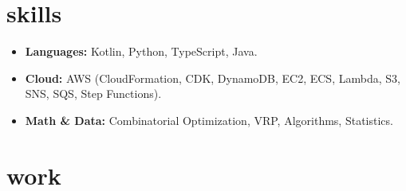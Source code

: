 \documentclass{friggeri-cv}
\begin{document}


  \section{skills}

      \begin{itemize}
        \item \textbf{Languages:} Kotlin, Python, TypeScript, Java.
        \item \textbf{Cloud:} AWS (CloudFormation, CDK, DynamoDB, EC2, ECS, Lambda, S3, SNS, SQS, Step Functions).
        \item \textbf{Math \& Data:} Combinatorial Optimization, VRP, Algorithms, Statistics.
      \end{itemize}



  \section{work}
\end{document}
